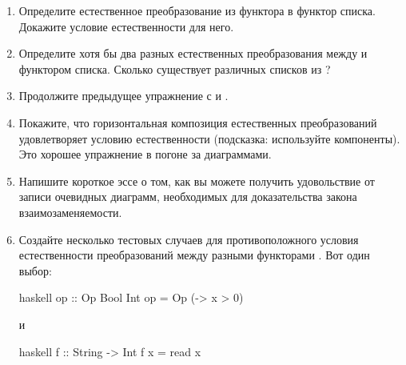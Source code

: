 \begin{enumerate}
  \tightlist
  \item
        Определите естественное преобразование из функтора  в
        функтор списка. Докажите условие естественности для него.
  \item
        Определите хотя бы два разных естественных преобразования между
         и функтором списка. Сколько существует различных списков из
        \code{()}?
  \item
        Продолжите предыдущее упражнение с  и
        .
  \item
        Покажите, что горизонтальная композиция естественных преобразований удовлетворяет
        условию естественности (подсказка: используйте компоненты). Это хорошее упражнение
        в погоне за диаграммами.
  \item
        Напишите короткое эссе о том, как вы можете получить удовольствие от записи очевидных
        диаграмм, необходимых для доказательства закона взаимозаменяемости.
  \item
        Создайте несколько тестовых случаев для противоположного условия естественности
        преобразований между разными функторами . Вот один
        выбор:

        \begin{snip}{haskell}
op :: Op Bool Int
op = Op (\x -> x > 0)
\end{snip}
        и

        \begin{snip}{haskell}
f :: String -> Int
f x = read x
\end{snip}
\end{enumerate}
